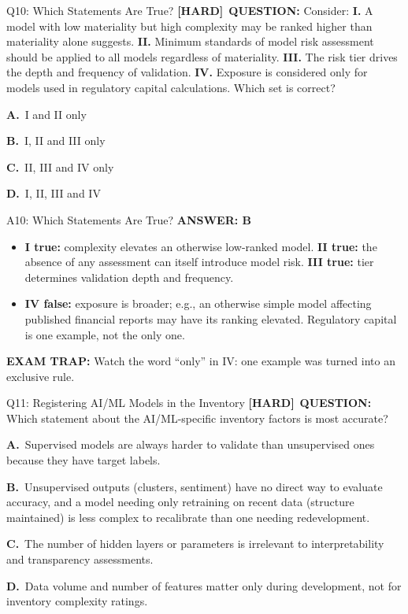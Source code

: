 \documentclass[8pt]{beamer}
\newcommand{\fs}{\fontsize{10}{12}\selectfont}
\newcommand{\opts}[4]{\par\vspace{0.12cm}\noindent\textbf{A.}~#1\par\vspace{0.08cm}\noindent\textbf{B.}~#2\par\vspace{0.08cm}\noindent\textbf{C.}~#3\par\vspace{0.08cm}\noindent\textbf{D.}~#4\par}
\newcommand{\ans}[1]{\textcolor{myblue}{\textbf{ANSWER: #1}}}
\newcommand{\trap}[1]{\textcolor{myred}{\textbf{EXAM TRAP:}} #1}
\newcommand{\hard}{\textcolor{myorange}{\textbf{[HARD]}}}
\begin{document}
\begin{frame}[t]{Q10: Which Statements Are True?}
\fs
\hard\ \textbf{QUESTION:} Consider: \textbf{I.} A model with low materiality but high complexity may be ranked higher than materiality alone suggests. \textbf{II.} Minimum standards of model risk assessment should be applied to all models regardless of materiality. \textbf{III.} The risk tier drives the depth and frequency of validation. \textbf{IV.} Exposure is considered only for models used in regulatory capital calculations. Which set is correct?
\opts{I and II only}
{I, II and III only}
{II, III and IV only}
{I, II, III and IV}
\end{frame}

\begin{frame}[t]{A10: Which Statements Are True?}
\fs
\ans{B}
\begin{itemize}
\item \textbf{I true:} complexity elevates an otherwise low-ranked model. \textbf{II true:} the absence of any assessment can itself introduce model risk. \textbf{III true:} tier determines validation depth and frequency.
\item \textbf{IV false:} exposure is broader; e.g., an otherwise simple model affecting published financial reports may have its ranking elevated. Regulatory capital is one example, not the only one.
\end{itemize}
\trap{Watch the word \textcolor{myred}{``only''} in IV: one example was turned into an exclusive rule.}
\end{frame}

\begin{frame}[t]{Q11: Registering AI/ML Models in the Inventory}
\fs
\hard\ \textbf{QUESTION:} Which statement about the AI/ML-specific inventory factors is most accurate?
\opts{Supervised models are always harder to validate than unsupervised ones because they have target labels.}
{Unsupervised outputs (clusters, sentiment) have no direct way to evaluate accuracy, and a model needing only retraining on recent data (structure maintained) is less complex to recalibrate than one needing redevelopment.}
{The number of hidden layers or parameters is irrelevant to interpretability and transparency assessments.}
{Data volume and number of features matter only during development, not for inventory complexity ratings.}
\end{frame}
\end{document}
